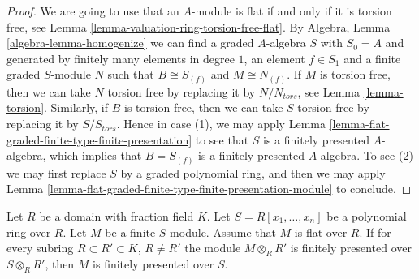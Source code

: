 \begin{proof}
We are going to use that an $A$-module is flat if and only if it is
torsion free, see
Lemma \ref{lemma-valuation-ring-torsion-free-flat}.
By
Algebra, Lemma \ref{algebra-lemma-homogenize}
we can find a graded $A$-algebra $S$ with $S_0 = A$ and generated
by finitely many elements in degree $1$, an element $f \in S_1$ and a
finite graded $S$-module $N$ such that $B \cong S_{(f)}$ and
$M \cong N_{(f)}$. If $M$ is torsion free, then we can take $N$ torsion
free by replacing it by $N/N_{tors}$, see
Lemma \ref{lemma-torsion}.
Similarly, if $B$ is torsion free, then we can take
$S$ torsion free by replacing it by $S/S_{tors}$.
Hence in case (1), we may apply
Lemma \ref{lemma-flat-graded-finite-type-finite-presentation}
to see that $S$ is a finitely presented
$A$-algebra, which implies that $B = S_{(f)}$ is a finitely
presented $A$-algebra. To see (2) we may first replace $S$ by
a graded polynomial ring, and then we may apply
Lemma \ref{lemma-flat-graded-finite-type-finite-presentation-module}
to conclude.
\end{proof}

\begin{lemma}
\label{lemma-helper-finite-type-flat-finite-presentation}
Let $R$ be a domain with fraction field $K$.
Let $S = R[x_1, \ldots, x_n]$ be a polynomial ring over $R$.
Let $M$ be a finite $S$-module. Assume that $M$ is flat over $R$.
If for every subring $R \subset R' \subset K$, $R \not = R'$
the module $M \otimes_R R'$ is finitely presented
over $S \otimes_R R'$, then $M$ is finitely presented over $S$.
\end{lemma}


